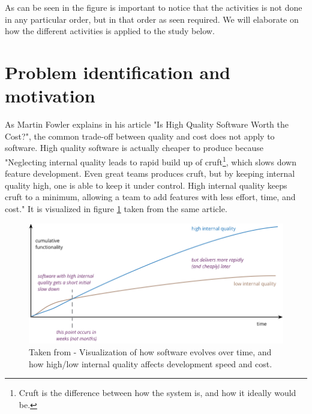 \documentclass{report}
\begin{document}
As can be seen in the figure is important to notice that the activities is not done in any particular order, but in that order as seen required. We will elaborate on how the different activities is applied to the study below. 

\section{Problem identification and motivation}
\label{problem-identification-and-motiviation}

As Martin Fowler explains in his article "Is High Quality Software Worth the Cost?"\cite{is-high-quality-softaware-worth-it}, the common trade-off between quality and cost does not apply to software. High quality software is actually cheaper to produce because "Neglecting internal quality leads to rapid build up of cruft\footnote{Cruft is the difference between how the system is, and how it ideally would be.}, which slows down feature development. Even great teams produces cruft, but by keeping internal quality high, one is able to keep it under control. High internal quality keeps cruft to a minimum, allowing a team to add features with less effort, time, and cost." It is visualized in figure \ref{fig:internal-quality-graph} taken from the same article.

\begin{figure}[h!]
    \centering
    \includegraphics[width=\linewidth]{report/internal-quality-graph.png}
    \caption{Taken from \cite{is-high-quality-softaware-worth-it} - Visualization of how software evolves over time, and how high/low internal quality affects development speed and cost.}
    \label{fig:internal-quality-graph}
\end{figure}
\end{document}
